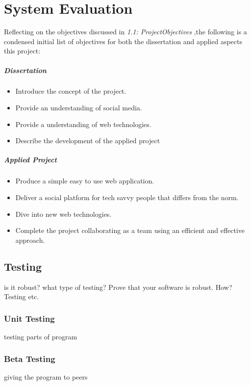 \chapter{System Evaluation}
Reflecting on the objectives discussed in \textit{1.1: ProjectObjectives} ,the following is a condensed initial list of objectives for both the dissertation and applied aspects this project: 

\paragraph{Dissertation}
\begin{itemize}
\item Introduce the concept of the project. 
\item Provide an understanding of social media.
\item Provide a understanding of web technologies.
\item Describe the development of the applied project
\end{itemize}
 
 \paragraph{Applied Project}
\begin{itemize}
\item Produce a simple easy to use web application.
\item Deliver a social platform for tech savvy people that differs from the norm.
\item Dive into new web technologies.
\item Complete the project collaborating as a team using an efficient and effective approach.
\end{itemize}

\section{Testing}
is it robust?
what type of testing?
 Prove that your software is robust. How? Testing etc. 
\subsection{Unit Testing}
testing parts of program
\subsection{Beta Testing}
giving the program to peers

